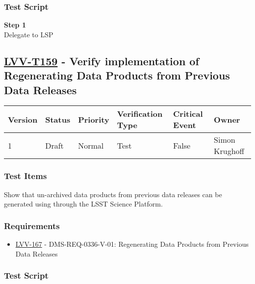 \subsubsection{Test Script}\label{test-script-25}

\textbf{Step 1}\\
Delegate to LSP\\[2\baselineskip]

\hypertarget{lvv-t159---verify-implementation-of-regenerating-data-products-from-previous-data-releases}{\subsection{\texorpdfstring{\href{https://jira.lsstcorp.org/secure/Tests.jspa\#/testCase/LVV-T159}{LVV-T159}
- Verify implementation of Regenerating Data Products from Previous Data
Releases}{LVV-T159 - Verify implementation of Regenerating Data Products from Previous Data Releases}}\label{lvv-t159---verify-implementation-of-regenerating-data-products-from-previous-data-releases}}

\begin{longtable}[]{@{}llllll@{}}
\toprule
Version & Status & Priority & Verification Type & Critical Event &
Owner\tabularnewline
\midrule
\endhead
1 & Draft & Normal & Test & False & Simon Krughoff\tabularnewline
\bottomrule
\end{longtable}

\subsubsection{Test Items}\label{test-items-26}

Show that un-archived data products from previous data releases can be
generated using through the LSST Science Platform.

\subsubsection{Requirements}\label{requirements-26}

\begin{itemize}
\tightlist
\item
  \href{https://jira.lsstcorp.org/browse/LVV-167}{LVV-167} -
  DMS-REQ-0336-V-01: Regenerating Data Products from Previous Data
  Releases
\end{itemize}

\subsubsection{Test Script}\label{test-script-26}

